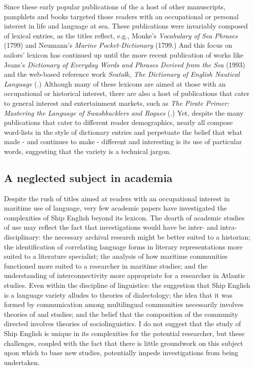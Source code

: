 Since these early popular publications of the  a host of other manuscripts, pamphlets and books targeted those readers with an occupational or personal interest in life and language at sea. These publications were invariably composed of lexical entries, as the titles reflect, e.g., Monke’s \textit{Vocabulary of Sea Phrases} (1799) and Neumann’s \textit{Marine Pocket-Dictionary} (1799.) And this focus on sailors’ lexicon has continued up until the more recent publication of works like Jeans’s \textit{Dictionary of Everyday Words and Phrases Derived from the S}\textit{ea} (1993) and the web-based reference work \textit{Seatalk, The Dictionary of English Nautical Language} (\citealt{MacKenzie2005}.) Although many of these lexicons are aimed at those with an occupational or historical interest, there are also a host of publications that cater to general interest and entertainment markets, such as \textit{The Pirate Primer: Mastering the Language of Swashbucklers and Rogues} (\citealt{Choundas2007}.) Yet, despite the many publications that cater to different reader demographics, nearly all compose word-lists in the style of dictionary entries and perpetuate the belief that what made - and continues to make -  different and interesting is its use of particular words, suggesting that the variety is a technical jargon. 



\subsection{{A} {neglected} {subject} {in} {academia}}%



Despite the rush of titles aimed at readers with an occupational interest in maritime use of language, very few academic papers have investigated the complexities of Ship English beyond its lexicon.  The dearth of academic studies of  use may reflect the fact that investigations would have be inter- and intra-disciplinary: the necessary archival research might be better suited to a historian; the identification of correlating language forms in literary representations more suited to a literature specialist; the analysis of how maritime communities functioned more suited to a researcher in maritime studies; and the understanding of interconnectivity more appropriate for a researcher in Atlantic studies. Even within the discipline of linguistics: the suggestion that Ship English is a language variety alludes to theories of dialectology; the idea that it was formed by communication among multilingual communities necessarily involves theories of  and  studies; and the belief that the composition of the community directed  involves theories of sociolinguistics. I do not suggest that the study of Ship English is unique in its complexities for the potential researcher, but these challenges, coupled with the fact that there is little groundwork on this subject upon which to base new studies, potentially impede investigations from being undertaken. 



